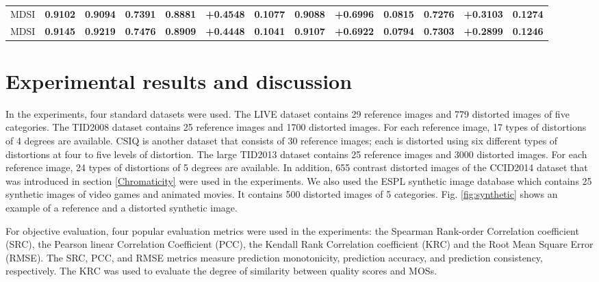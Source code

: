\begin{table*}[htb]
\begin{tabular}{c|ccc|l|ccc|ccc|ccc}
MDSI                       & \textbf{0.9102}   & \textbf{0.9094}   & \multicolumn{2}{c|}{\textbf{0.7391}} & \textbf{0.8881} & \textbf{+0.4548} & \textbf{0.1077} & \textbf{0.9088} & \textbf{+0.6996} & \textbf{0.0815} & \textbf{0.7276} & \textbf{+0.3103} & \textbf{0.1274} \\
MDSI                       & \textbf{0.9145}   & \textbf{0.9219}   & \multicolumn{2}{c|}{\textbf{0.7476}} & \textbf{0.8909} & \textbf{+0.4448} & \textbf{0.1041} & \textbf{0.9107} & \textbf{+0.6922} & \textbf{0.0794} & \textbf{0.7303} & \textbf{+0.2899} & \textbf{0.1246} \\
\hline       
\end{tabular}
\label{results2}
\end{table*}

 
 
 





\section{Experimental results and discussion}
\label{results}

In the experiments, four standard datasets were used. The LIVE dataset \cite{LIVEweb} contains 29 reference images and 779 distorted images of five categories. The TID2008 \cite{TID2008} dataset contains 25 reference images and 1700 distorted images. For each reference image, 17 types of distortions of 4 degrees are available. CSIQ \cite{MAD} is another dataset that consists of 30 reference images; each is distorted using six different types of distortions at four to five levels of distortion. The large TID2013 \cite{TID2013} dataset contains 25 reference images and 3000 distorted images. For each reference image, 24 types of distortions of 5 degrees are available. In addition, 655 contrast distorted images of the CCID2014 dataset \cite{CCID2014} that was introduced in section \ref{Chromaticity} were used in the experiments. We also used the ESPL synthetic image database which contains 25 synthetic images of video games and animated movies. It contains 500 distorted images of 5 categories. Fig. \ref{fig:synthetic} shows an example of a reference and a distorted synthetic image. 






For objective evaluation, four popular evaluation metrics were used in the experiments: the Spearman Rank-order Correlation coefficient (SRC), the Pearson linear Correlation Coefficient (PCC), the Kendall Rank Correlation coefficient (KRC) and the Root Mean Square Error (RMSE). The SRC, PCC, and RMSE metrics measure prediction monotonicity, prediction accuracy, and prediction consistency, respectively. The KRC was used to evaluate the degree of similarity between quality scores and MOSs.


